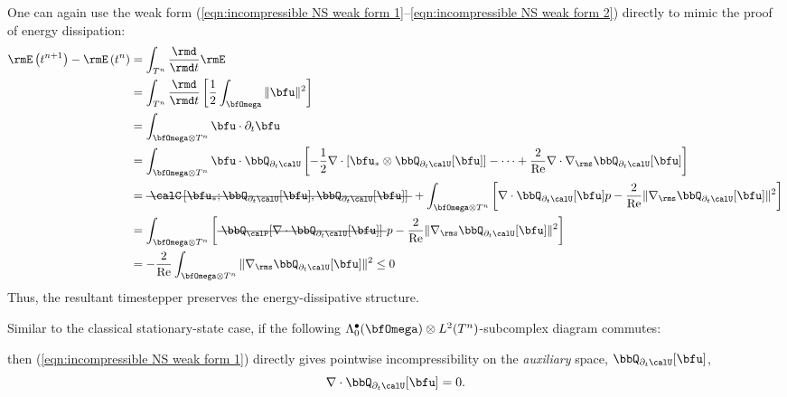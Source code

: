     \line

    One can again use the weak form (\ref{eqn:incompressible NS weak form 1}--\ref{eqn:incompressible NS weak form 2}) directly to mimic the proof of energy dissipation:
    \begin{align}
        \rmE\left(t^{n + 1}\right) - \rmE\left(t^{n}\right)
        &=  \int_{T^{n}}\frac{\rmd}{\rmd t}\rmE  \\
        &=  \int_{T^{n}}\frac{\rmd}{\rmd t}\left[\frac{1}{2}\int_{\bfOmega}\|\bfu\|^{2}\right]  \\
        &=  \int_{\bfOmega\otimes T^{n}}\bfu\cdot\partial_{t}\bfu  \\
        &=  \int_{\bfOmega\otimes T^{n}}\bfu\cdot\bbQ_{\partial_{t}\calU}\left[- \frac{1}{2}\nabla\cdot\left[\bfu_{*}\otimes\bbQ_{\partial_{t}\calU}[\bfu]\right] - \cdots + \frac{2}{\rmRe}\nabla\cdot\nabla_{\rms}\bbQ_{\partial_{t}\calU}[\bfu]\right]  \\
        &=  \mst{\calC\left[\bfu_{*}; \bbQ_{\partial_{t}\calU}[\bfu], \bbQ_{\partial_{t}\calU}[\bfu]\right]} + \int_{\bfOmega\otimes T^{n}}\left[\nabla\cdot\bbQ_{\partial_{t}\calU}[\bfu]p - \frac{2}{\rmRe}\|\nabla_{\rms}\bbQ_{\partial_{t}\calU}[\bfu]\|^{2}\right]  \\
        &=  \int_{\bfOmega\otimes T^{n}}\left[\mst{\bbQ_{\calP}[\nabla\cdot\bbQ_{\partial_{t}\calU}[\bfu]]}p - \frac{2}{\rmRe}\|\nabla_{\rms}\bbQ_{\partial_{t}\calU}[\bfu]\|^{2}\right]  \\
        &=  - \frac{2}{\rmRe}\int_{\bfOmega\otimes T^{n}}\|\nabla_{\rms}\bbQ_{\partial_{t}\calU}[\bfu]\|^{2}  \leq  0  \label{eqn:incompressible NS weak form dissipation}
    \end{align}
    Thus, the resultant timestepper preserves the energy-dissipative structure.

    \shortline

    Similar to the classical stationary-state case, if the following $\Lambda_{0}^{\bullet}(\bfOmega)\otimes L^{2}(T^{n})$-subcomplex diagram commutes:
    \begin{center}\end{center}
    then (\ref{eqn:incompressible NS weak form 1}) directly gives pointwise incompressibility on the \emph{auxiliary} space, $\bbQ_{\partial_{t}\calU}[\bfu]$,
    \begin{equation}
        \nabla\cdot\bbQ_{\partial_{t}\calU}[\bfu]  =  0.
    \end{equation}

